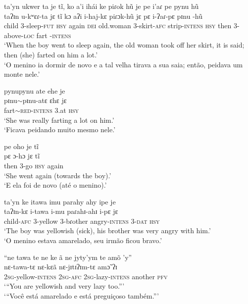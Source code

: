 \documentclass[output=paper,
modfonts,nonflat
]{langsci/langscibook}
\begin{document}
\ea ta'yn ukwer ta je tĩ, ko a'i ihái ke piɾok hũ je pe i'aɾ pe pynu hũ \\[.3em]
\gll taʔɪn u-kʷɛɾ-ta jɛ tĩ kɔ aʔi i-haj-kɛ piɾɔk-hũ jɛ pɛ i-ʔaɾ-pɛ pɪnu -hũ \\
child 3-sleep\textsc{-fut} \textsc{hsy} again \textsc{dei} old.woman 3-skirt\textsc{-afc} strip\textsc{-intens} \textsc{hsy} then 3-above\textsc{-loc} fart \textsc{-intens} \\
\glt ‘When the boy went to sleep again, the old woman took off her skirt, it is said; then (she) farted on him a lot.’ \\
‘O menino ia dormir de novo e a tal velha tirava a sua saia; então, peidava um monte nele.’ \\
\z

\ea pynupynu ate ehe je \\[.3em]
\gll pɪnu$\sim$pɪnu-atɛ ɛhɛ jɛ \\
fart$\sim$\textsc{red}-\textsc{intens} 3.at \textsc{hsy} \\
\glt ‘She was really farting a lot on him.’ \\
‘Ficava peidando muito mesmo nele.’ \\
\z

\ea pe oho je tĩ \\[.3em]
\gll pɛ ɔ-hɔ jɛ tĩ \\
then 3-go \textsc{hsy} again \\
\glt ‘She went again (towards the boy).’ \\
‘E ela foi de novo (até o menino).’ \\
\z

\ea ta'yn ke itawa imu parahy ahy ipe je \\[.3em]
\gll taʔɪn-kɛ i-tawa i-mu paɾahɪ-ahɪ i-pɛ jɛ \\
child\textsc{-afc} 3-yellow 3-bɾother angry-\textsc{intens} \textsc{3-dat} \textsc{hsy} \\
\glt ‘The boy was yellowish (sick), his brother was very angry with him.’ \\
‘O menino estava amarelado, seu irmão ficou bravo.’ \\
\z

\largerpage
\ea “ne tawa te ne ke ã ne jyty'ym te amõ 'y” \\[.3em]
\gll nɛ-tawa-tɛ nɛ-kɛã nɛ-jɪtɪʔɪm-tɛ amɔ̃ ʔɪ \\
\textsc{2sg}-yellow-\textsc{intens} \textsc{2sg-afc} \textsc{2sg}-lazy\textsc{-intens} another \textsc{pfv} \\
\glt ‘“You are yellowish and very lazy too.”’ \\
‘“Você está amarelado e está preguiçoso também.”’ \\
\z
\end{document}
